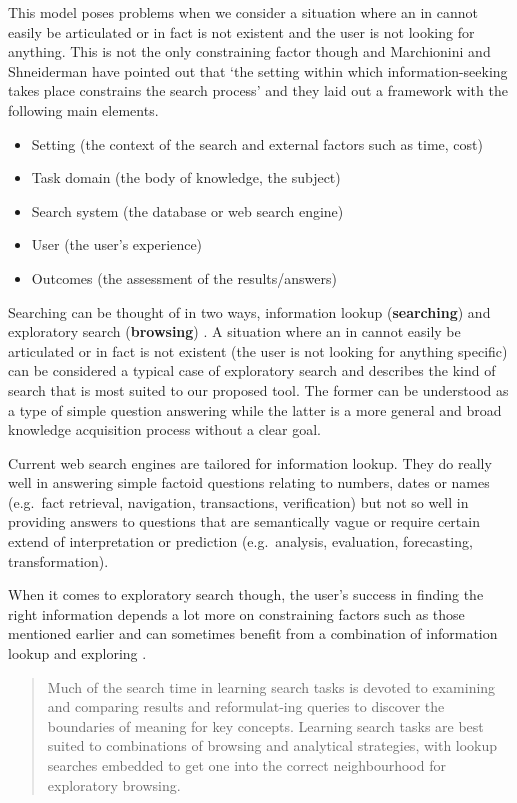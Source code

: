 This model poses problems when we consider a situation where an \gls{in} cannot easily be articulated or in fact is not existent and the user is not looking for anything. This is not the only constraining factor though and Marchionini and Shneiderman have pointed out that `the setting within which information-seeking takes place constrains the search process' \autocite{Marchionini1988} and they laid out a framework with the following main elements.

\begin{itemize}
  \item Setting (the context of the search and external factors such as time, cost)
  \item Task domain (the body of knowledge, the subject)
  \item Search system (the database or web search engine)
  \item User (the user’s experience)
  \item Outcomes (the assessment of the results/answers)
\end{itemize}

Searching can be thought of in two ways, information lookup (\textbf{searching}) and exploratory search (\textbf{browsing}) \autocite{DeVries1993, Marchionini2006}. A situation where an \gls{in} cannot easily be articulated or in fact is not existent (the user is not looking for anything specific) can be considered a typical case of exploratory search and describes the kind of search that is most suited to our proposed tool. The former can be understood as a type of simple question answering while the latter is a more general and broad knowledge acquisition process without a clear goal.

Current web search engines are tailored for information lookup. They do really well in answering simple factoid questions relating to numbers, dates or names (e.g.\ fact retrieval, navigation, transactions, verification) but not so well in providing answers to questions that are semantically vague or require certain extend of interpretation or prediction (e.g.\ analysis, evaluation, forecasting, transformation).

When it comes to exploratory search though, the user’s success in finding the right information depends a lot more on constraining factors such as those mentioned earlier and can sometimes benefit from a combination of information lookup and exploring \autocite{Marchionini2006}.

\begin{quotation}
  Much of the search time in learning search tasks is devoted to examining and comparing results and reformulat-ing queries to discover the boundaries of meaning for key concepts. Learning search tasks are best suited to combinations of browsing and analytical strategies, with lookup searches embedded to get one into the correct neighbourhood for exploratory browsing. 
\end{quotation}

